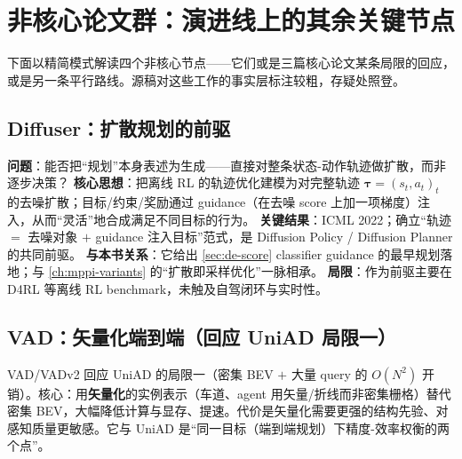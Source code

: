 \section{非核心论文群：演进线上的其余关键节点}
\label{sec:de-rest}

下面以精简模式解读四个非核心节点——它们或是三篇核心论文某条局限的回应，或是另一条平行路线。源稿对这些工作的事实层标注较粗，存疑处照登。

\subsection{Diffuser：扩散规划的前驱}
\label{sec:de-diffuser}

\begin{paper}\label{paper:de-diffuser}
\textbf{问题}：能否把“规划”本身表述为生成——直接对整条状态-动作轨迹做扩散，而非逐步决策？
\textbf{核心思想}\cite{janner2022diffuser}：把离线 RL 的轨迹优化建模为对完整轨迹 $\boldsymbol{\tau}=(s_t,a_t)_{t}$ 的去噪扩散；目标/约束/奖励通过 guidance（在去噪 score 上加一项梯度）注入，从而“灵活”地合成满足不同目标的行为。
\textbf{关键结果}：ICML 2022；确立“轨迹 $=$ 去噪对象 $+$ guidance 注入目标”范式，是 Diffusion Policy / Diffusion Planner 的共同前驱。
\textbf{与本书关系}：它给出 \cref{sec:de-score} classifier guidance 的最早规划落地；与 \cref{ch:mppi-variants} 的“扩散即采样优化”一脉相承。
\textbf{局限}：作为前驱主要在 D4RL 等离线 RL benchmark，未触及自驾闭环与实时性。
\end{paper}

\subsection{VAD：矢量化端到端（回应 UniAD 局限一）}
\label{sec:de-vad}

VAD/VADv2\cite{jiang2023vad} 回应 UniAD 的局限一（密集 BEV $+$ 大量 query 的 $O(N^2)$ 开销）。核心：用\textbf{矢量化}的实例表示（车道、agent 用矢量/折线而非密集栅格）替代密集 BEV，大幅降低计算与显存、提速。代价是矢量化需要更强的结构先验、对感知质量更敏感。它与 UniAD 是“同一目标（端到端规划）下精度-效率权衡的两个点”。

